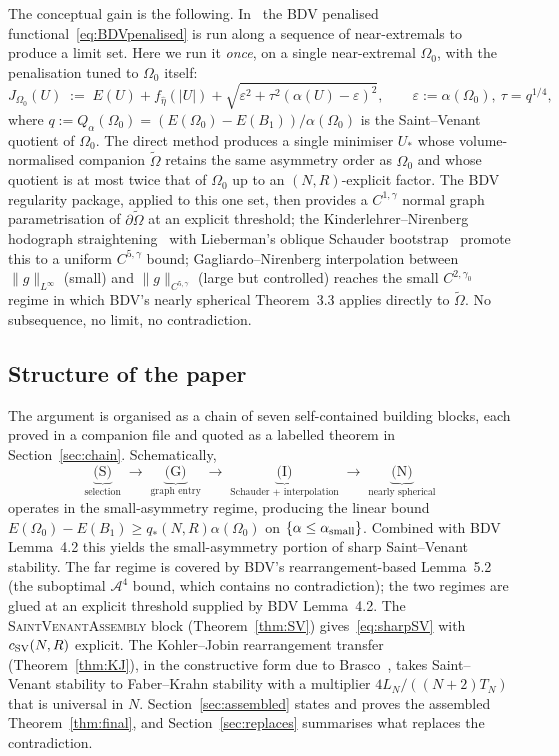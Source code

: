 \documentclass[11pt]{article}
\theoremstyle{definition}
\newcommand{\Fr}{\mathcal{A}}
\newcommand{\Om}{\Omega}
\newcommand{\Otilde}{\widetilde{\Omega}}
\newcommand{\eps}{\varepsilon}
\begin{document}
The conceptual gain is the following. In~\cite{BDV} the BDV penalised
functional~\eqref{eq:BDVpenalised} is run along a sequence of
near-extremals to produce a limit set. Here we run it \emph{once}, on
a single near-extremal $\Om_0$, with the penalisation tuned to
$\Om_0$ itself:
\[
   J_{\Om_0}(U)\;:=\;
   E(U)+f_{\hat\eta}(|U|)+\sqrt{\eps^2+\tau^2(\alpha(U)-\eps)^2},
   \qquad \eps:=\alpha(\Om_0),\ \tau=q^{1/4},
\]
where $q:=Q_\alpha(\Om_0)=(E(\Om_0)-E(B_1))/\alpha(\Om_0)$ is the
Saint--Venant quotient of $\Om_0$. The direct method produces a single
minimiser $U_*$ whose volume-normalised companion $\Otilde$ retains
the same asymmetry order as $\Om_0$ and whose quotient is at most
twice that of $\Om_0$ up to an $(N,R)$-explicit factor. The BDV
regularity package, applied to this one set, then provides a
$C^{1,\gamma}$ normal graph parametrisation of $\partial\Otilde$ at
an explicit threshold; the Kinderlehrer--Nirenberg hodograph
straightening~\cite{KN} with Lieberman's oblique Schauder
bootstrap~\cite{Li86} promote this to a uniform $C^{5,\gamma}$ bound;
Gagliardo--Nirenberg interpolation between $\|g\|_{L^\infty}$ (small)
and $\|g\|_{C^{5,\gamma}}$ (large but controlled) reaches the small
$C^{2,\gamma_0}$ regime in which BDV's nearly spherical Theorem~3.3
applies directly to $\Otilde$. No subsequence, no limit, no
contradiction.

\subsection{Structure of the paper}\label{ssec:structure}

The argument is organised as a chain of seven self-contained building
blocks, each proved in a companion file and quoted as a labelled
theorem in Section~\ref{sec:chain}. Schematically,
\[
   \underbrace{\text{(S)}}_{\text{selection}}\;\to\;
   \underbrace{\text{(G)}}_{\text{graph entry}}\;\to\;
   \underbrace{\text{(I)}}_{\text{Schauder + interpolation}}\;\to\;
   \underbrace{\text{(N)}}_{\text{nearly spherical}}
\]
operates in the small-asymmetry regime, producing the linear bound
$E(\Om_0)-E(B_1)\ge q_*(N,R)\alpha(\Om_0)$ on
$\{\alpha\le\alpha_{\rm small}\}$. Combined with BDV Lemma~4.2 this
yields the small-asymmetry portion of sharp Saint--Venant stability.
The far regime is covered by BDV's rearrangement-based Lemma~5.2 (the
suboptimal $\Fr^4$ bound, which contains no contradiction); the two
regimes are glued at an explicit threshold supplied by BDV
Lemma~4.2. The \textsc{SaintVenantAssembly} block
(Theorem~\ref{thm:SV}) gives~\eqref{eq:sharpSV} with $c_{\rm SV}(N,R)$
explicit. The Kohler--Jobin rearrangement transfer
(Theorem~\ref{thm:KJ}), in the constructive form due to
Brasco~\cite{Brasco2014}, takes Saint--Venant stability to
Faber--Krahn stability with a multiplier $4L_N/((N+2)T_N)$ that is
universal in $N$. Section~\ref{sec:assembled} states and proves the
assembled Theorem~\ref{thm:final}, and Section~\ref{sec:replaces}
summarises what replaces the contradiction.
\end{document}
